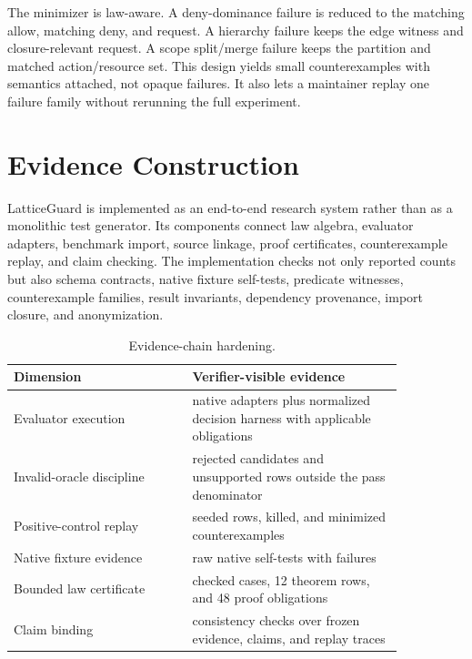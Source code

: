 \documentclass[10pt,conference]{IEEEtran}
\begin{document}
The minimizer is law-aware.  A deny-dominance failure is reduced to the matching allow, matching deny, and request.  A hierarchy failure keeps the edge witness and closure-relevant request.  A scope split/merge failure keeps the partition and matched action/resource set.  This design yields small counterexamples with semantics attached, not opaque failures.  It also lets a maintainer replay one failure family without rerunning the full experiment.

\section{Evidence Construction}
\label{sec:evidence}
LatticeGuard is implemented as an end-to-end research system rather than as a monolithic test generator.  Its components connect law algebra, evaluator adapters, benchmark import, source linkage, proof certificates, counterexample replay, and claim checking.  The implementation checks not only reported counts but also schema contracts, native fixture self-tests, predicate witnesses, counterexample families, result invariants, dependency provenance, import closure, and anonymization.


\begin{table}[t]
\centering
\caption{Evidence-chain hardening.}
\label{tab:repo}
\begin{tabular}{p{0.39\linewidth}p{0.46\linewidth}}
\toprule
Dimension & Verifier-visible evidence \\
\midrule
Evaluator execution & \LGNativeAdapters{} native adapters plus \LGDecisionHarnesses{} normalized decision harness with \LGPrimaryObligations{} applicable obligations \\
Invalid-oracle discipline & \LGRejected{} rejected candidates and \LGUnsupported{} unsupported rows outside the pass denominator \\
Positive-control replay & \LGSeededRows{} seeded rows, \LGSeededKilled{} killed, and \LGCounterexamples{} minimized counterexamples \\
Native fixture evidence & \LGNativeSelftests{} raw native self-tests with \LGNativeFailures{} failures \\
Bounded law certificate & \LGModelCheckCases{} checked cases, 12 theorem rows, and 48 proof obligations \\
Claim binding & \LGAggregateChecks{} consistency checks over frozen evidence, claims, and replay traces \\
\bottomrule
\end{tabular}
\end{table}
\end{document}
